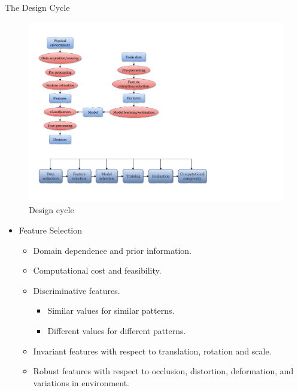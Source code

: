 \begin{frame}{The Design Cycle}
\begin{figure}
\includegraphics[width=\textwidth]{Figures/DesignCycle}
\caption{Design cycle}
\end{figure}
\vspace{-20pt}
\begin{itemize}
\setlength{\itemsep}{12pt}
\item {\color{mycolor2}Feature Selection}
\begin{itemize}
\setlength{\itemsep}{3pt}
\item Domain dependence and prior information.
\item Computational cost and feasibility.
\item Discriminative features.
\begin{itemize}
\item Similar values for similar patterns.
\item Different values for different patterns.
\end{itemize}
\item Invariant features with respect to translation, rotation and
scale.
\item Robust features with respect to occlusion, distortion,
deformation, and variations in environment.
\end{itemize}
\end{itemize}
\end{frame}

